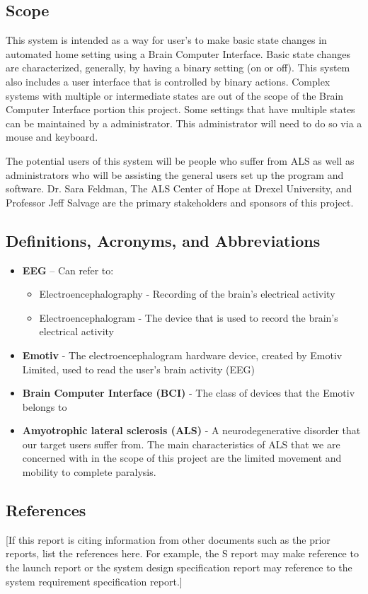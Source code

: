 \documentclass{article}
\begin{document}
\subsection{Scope}

This system is intended as a way for user's to make basic state changes in automated home setting
using a Brain Computer Interface. Basic state changes are characterized, generally, by having a binary 
setting (on or off). This system also includes a user interface that is controlled by binary actions. Complex 
systems with multiple or intermediate states are out of the scope of the Brain Computer Interface portion 
this project. Some settings that have multiple states can be maintained by a administrator. This 
administrator will need to do so via a mouse and keyboard. 

The potential users of this system will be people who suffer from ALS as well as administrators 
who will be assisting the general users set up the program and software. Dr. Sara Feldman, The ALS 
Center of Hope at Drexel University, and Professor Jeff Salvage are the primary stakeholders and 
sponsors of this project.

\subsection{Definitions, Acronyms, and Abbreviations}
\begin{itemize}
\item \textbf{EEG} – Can refer to:
\begin{itemize}
	\item Electroencephalography - Recording of the brain's electrical activity 
	\item Electroencephalogram - The device that is used to record the brain's electrical activity
\end{itemize}
\item \textbf{Emotiv} - The electroencephalogram hardware device, created by Emotiv Limited, used to read the user's 
brain activity (EEG)
\item \textbf{Brain Computer Interface (BCI)} - The class of devices that the Emotiv belongs to
\item \textbf{Amyotrophic lateral sclerosis (ALS)} - A neurodegenerative disorder that our target users suffer from. 
The main characteristics of ALS that we are concerned with in the scope of this project are the limited 
movement and mobility to complete paralysis.
\end{itemize}
\subsection{References}
[If this report is citing information from other documents such as the prior reports, list the references here. 
For example, the S report may make reference to the launch report or the system design specification 
report may reference to the system requirement specification report.]
\end{document}
